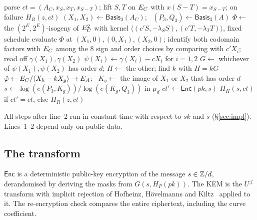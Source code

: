 \begin{algorithm}[h]
\caption[$\textsf{Decaps}(\mathit{sk},\mathit{ct})$]{$\textsf{Decaps}(\mathit{sk},\mathit{ct})$}\label{alg:decaps}
\begin{algorithmic}[1]
\State parse $\mathit{ct}=(A_C,x_S,x_T,x_{S-T})$; lift $S,T$ on $E_C$ with $x(S-T)=x_{S-T}$; on failure \Return $H_R(z,\mathit{ct})$ 
\State $(X_1,X_2)\gets\textsf{Basis}_3(A_C)$; \ $(P_3,Q_3)\gets\textsf{Basis}_3(A)$ 
\State $\Phi\gets$ the $(2^E,2^E)$-isogeny of $E_C^2$ with kernel $\langle(c'S,-\lambda_SS),(c'T,-\lambda_TT)\rangle$, fixed schedule
\State evaluate $\Phi$ at $(X_1,0),(0,X_1),(X_2,0)$; identify both codomain factors with $E_C$ among the $8$ sign and order choices by comparing with $c'X_i$; read off $\gamma(X_1),\gamma(X_2)$
\State $\psi(X_i)\gets\gamma(X_i)-cX_i$ for $i=1,2$
\State $G\gets$ whichever of $\psi(X_1),\psi(X_2)$ has order $d$; $H\gets$ the other; find $k$ with $H=kG$ 
\State $\hat\varphi\gets E_C/\langle X_h-kX_g\rangle\to E_A$; \ $K_g\gets$ the image of $X_1$ or $X_2$ that has order $d$
\State $s\gets\log(e(P_3,K_g))/\log(e(K_g,Q_3))$ in $\mu_d$
\State $\mathit{ct}'\gets\textsf{Enc}(\mathit{pk},s)$
\State \Return $H_K(s,\mathit{ct})$ if $\mathit{ct}'=\mathit{ct}$, else $H_R(z,\mathit{ct})$ 
\end{algorithmic}
\end{algorithm}

All steps after line~2 run in constant time with respect to $\mathit{sk}$ and
$s$ (\S\ref{sec:impl}). Lines~1--2 depend only on public data.

\subsection{The transform}
$\textsf{Enc}$ is a deterministic public-key encryption of the message
$s\in\mathbb{Z}/d$, derandomised by deriving the masks from $G(s,H_P(\mathit{pk}))$.
The KEM is the $U^{\not\perp}$ transform with implicit rejection of Hofheinz,
H\"ovelmanns and Kiltz~\cite{HHK17} applied to it. The re-encryption check
compares the entire ciphertext, including the curve coefficient.
